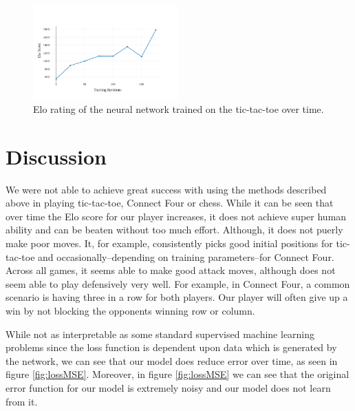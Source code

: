\documentclass[english]{article}
\begin{document}
\begin{figure}[h]
\centering
	\includegraphics[width=0.5\textwidth]{./images/ttt}
\caption{Elo rating of the neural network trained on the tic-tac-toe over time.}
\end{figure}


\section{Discussion}
We were not able to achieve great success with using the methods described above
in playing tic-tac-toe, Connect Four or chess. While it can be seen that over
time the Elo score for our player increases, it does not achieve super human
ability and can be beaten without too much effort. Although, it does not puerly
make poor moves. It, for example, consistently picks good initial positions for
tic-tac-toe and occasionally--depending on training parameters--for Connect
Four. Across all games, it seems able to make good attack moves, although does
not seem able to play defensively very well. For example, in Connect Four, a
common scenario is having three in a row for both players. Our player will often
give up a win by not blocking the opponents winning row or column.

While not as interpretable as some standard supervised machine learning
problems since the loss function is dependent upon data which is generated by
the network, we can see that our model does reduce error over time, as seen in
figure \ref{fig:lossMSE}. Moreover, in figure \ref{fig:lossMSE} we can see that the original
error function for our model is extremely noisy and our model does not learn
from it.
\end{document}
